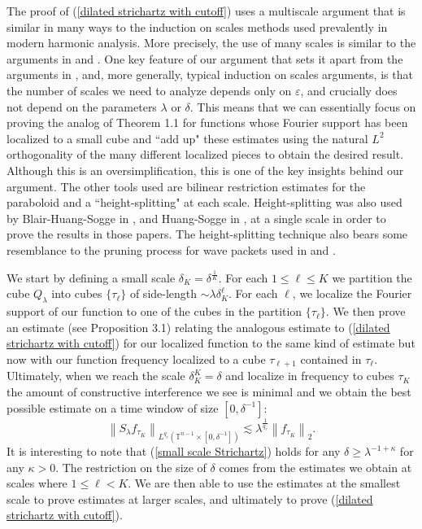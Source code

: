 \documentclass[11pt]{amsart}
\numberwithin{equation}{section}
\newcommand{\Tn}{\mathbb{T}^{n-1}}
\newcommand{\la}{\lambda}
\newcommand\norm[1]{\left\lVert#1\right\rVert}
\newcommand{\lpnorm}[3]{\norm{#1}_{L^{#2}(#3)}}
\newcommand{\altlpnorm}[2]{\norm{#1}_{#2}}
\newcommand{\Sl}{S_{\la}}
\newcommand{\dK}[1]{\delta_{K}^{#1}}
\begin{document}
The proof of (\ref{dilated strichartz with cutoff}) uses a multiscale argument that is similar in many ways to the induction on scales methods used prevalently in modern harmonic analysis. More precisely, the use of many scales is similar to the arguments in \cite{FuGuthMaldagueSuperlevelSetDecoupling} and \cite{GuthMaldagueWangImprovedDecoupling}. One key feature of our argument that sets it apart from the arguments in \cite{FuGuthMaldagueSuperlevelSetDecoupling}, \cite{GuthMaldagueWangImprovedDecoupling} and, more generally, typical induction on scales arguments, is that the number of scales we need to analyze depends only on $\varepsilon$, and crucially does not depend on the parameters $\la$ or $\delta$. This means that we can essentially focus on proving the analog of Theorem 1.1 for functions whose Fourier support has been localized to a small cube and ``add up" these estimates using the natural $L^2$ orthogonality of the many different localized pieces to obtain the desired result. Although this is an oversimplification, this is one of the key insights behind our argument. The other tools used are bilinear restriction estimates for the paraboloid and a ``height-splitting" at each scale. Height-splitting was also used by Blair-Huang-Sogge in \cite{BlairHuangSoggeImprovedSpectral}, \cite{BlairHuangSoggeStrichartz} and Huang-Sogge in \cite{HuangSoggeStrichartz}, \cite{huang2024curvature} at a single scale in order to prove the results in those papers. The height-splitting technique also bears some resemblance to the pruning process for wave packets used in \cite{FuGuthMaldagueSuperlevelSetDecoupling} and \cite{GuthMaldagueWangImprovedDecoupling}.

We start by defining a small scale $\dK{} = \delta^{\frac{1}{K}}$. For each $1 \leq \ell \leq K$ we partition the cube $Q_{\la}$ into cubes $\{\tau_{\ell}\}$ of side-length $\sim \la \dK{\ell}$. For each $\ell$, we localize the Fourier support of our function to one of the cubes in the partition $\{\tau_{\ell}\}$. We then prove an estimate (see Proposition 3.1) relating the analogous estimate to (\ref{dilated strichartz with cutoff}) for our localized function to the same kind of estimate but now with our function frequency localized to a cube $\tau_{\ell + 1}$ contained in $\tau_{\ell}$. Ultimately, when we reach the scale $\dK{K} = \delta$ and localize in frequency to cubes $\tau_{K}$ the amount of constructive interference we see is minimal and we obtain the best possible estimate on a time window of size $[0, \delta^{-1}]$: 
\begin{equation}\label{small scale Strichartz}
    \lpnorm{\Sl f_{\tau_{K}}}{q_c}{\Tn \times [0, \delta^{-1}]} \lesssim \la^{\frac{1}{q_c}}\altlpnorm{f_{\tau_{K}}}{2}.
\end{equation}
It is interesting to note that (\ref{small scale Strichartz}) holds for any $\delta \geq \la^{-1 + \kappa}$ for any $\kappa > 0$. The restriction on the size of $\delta$ comes from the estimates we obtain at scales where $1 \leq \ell < K$. We are then able to use the estimates at the smallest scale to prove estimates at larger scales, and ultimately to prove (\ref{dilated strichartz with cutoff}).
\end{document}
